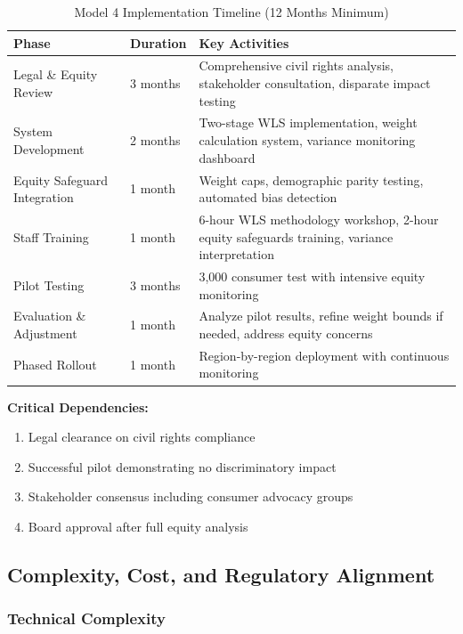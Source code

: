 \begin{table}[h]
\centering
\caption{Model 4 Implementation Timeline (12 Months Minimum)}
\begin{tabular}{llp{7cm}}
\toprule
\textbf{Phase} & \textbf{Duration} & \textbf{Key Activities} \\
\midrule
Legal \& Equity Review & 3 months & Comprehensive civil rights analysis, stakeholder consultation, disparate impact testing \\
System Development & 2 months & Two-stage WLS implementation, weight calculation system, variance monitoring dashboard \\
Equity Safeguard Integration & 1 month & Weight caps, demographic parity testing, automated bias detection \\
Staff Training & 1 month & 6-hour WLS methodology workshop, 2-hour equity safeguards training, variance interpretation \\
Pilot Testing & 3 months & 3,000 consumer test with intensive equity monitoring \\
Evaluation \& Adjustment & 1 month & Analyze pilot results, refine weight bounds if needed, address equity concerns \\
Phased Rollout & 1 month & Region-by-region deployment with continuous monitoring \\
\bottomrule
\end{tabular}
\end{table}

\textbf{Critical Dependencies:}
\begin{enumerate}
    \item Legal clearance on civil rights compliance
    \item Successful pilot demonstrating no discriminatory impact
    \item Stakeholder consensus including consumer advocacy groups
    \item Board approval after full equity analysis
\end{enumerate}

\subsection{Complexity, Cost, and Regulatory Alignment}

\subsubsection{Technical Complexity}

